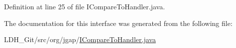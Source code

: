 Definition at line 25 of file I\-Compare\-To\-Handler.\-java.



The documentation for this interface was generated from the following file\-:\begin{DoxyCompactItemize}
\item 
L\-D\-H\-\_\-\-Git/src/org/jgap/\hyperlink{_i_compare_to_handler_8java}{I\-Compare\-To\-Handler.\-java}\end{DoxyCompactItemize}
